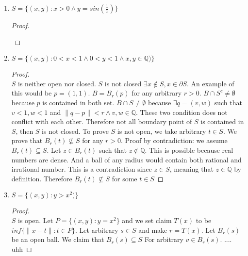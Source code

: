 \documentclass[11pt]{article}
\begin{document}
\begin{enumerate}
  \item $S = \{ (x,y): x>0 \land y=sin(\frac{1}{x})\}$
  \begin{proof}
    $ $\\
    \begin{center}
    \end{center}

  \end{proof}


  \item $S = \{ (x,y): 0<x<1 \land 0<y<1 \land x,y\in \mathbb{Q})\}$

  \begin{proof}
    $ $\\
    $S$ is neither open nor closed. $S$ is not closed $\exists x\not\in S, x\in \partial S$. An example of this would be $p=(1,1)$. $B=B_r(p)$ for any arbitrary $r>0$. $B\cap S^c \neq \emptyset$ because $p$ is contained in both set. $B\cap S\neq \emptyset$ because $\exists q=(v,w)$ such that $v<1, w<1$ and $\|q-p\| < r \land v,w\in \mathbb{Q}$. These two condition does not conflict with each other.  Therefore not all boundary point of $S$ is contained in $S$, then $S$ is not closed. To prove $S$ is not open, we take arbitrary $t\in S$. We prove that $B_r(t) \not\subseteq S$ for any $r>0$. Proof by contradiction: we assume $B_r(t) \subseteq S$. Let $z\in B_r(t)$ such that $z\not\in \mathbb{Q}$. This is possible because real numbers are dense. And a ball of any radius would contain both rational and irrational number. This is a contradiction since $z\in S$, meaning that $z\in \mathbb{Q}$ by definition. Therefore $B_r(t) \not\subseteq S$ for some $t\in S$
  \end{proof}

  \item $S = \{ (x,y): y > x^2)\}$
  \begin{proof}
    $ $\\
    $S$ is open. Let $P=\{ (x,y): y=x^2\}$ and we set claim $T(x)$ to be $inf\{ \|x - t\| : t\in P\}$. Let arbitrary $s\in S$ and make $r= T(x)$. Let $B_r(s)$ be an open ball. We claim that $B_r(s)\subseteq S$ For arbitrary $v\in B_r(s)$. .... uhh
  \end{proof}
\end{enumerate}
\end{document}
